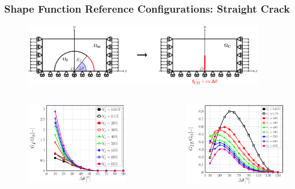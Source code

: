 \documentclass[first,firstsupp,lastsupp,last,hyperref,table]{ETHclass}
\begin{document}
\begin{frame}
\frametitle{\vspace{0.4cm}\footnotesize Shape Function Reference Configurations: Straight Crack}
\vspace{-1.25cm}
\centering
\begin{figure}
\includegraphics[width=0.9\textwidth]{RUCstraightcrack.pdf}
\end{figure}
\vspace{-0.5cm}
\begin{columns}[c]
\begin{column}{0.5\textwidth}
\centering
\begin{figure}
\centering
\includegraphics[width=0.9\columnwidth]{GI-free-straightcrack.pdf}
\end{figure}
\end{column}
\begin{column}{0.5\textwidth}
\centering
\begin{figure}
\centering
\includegraphics[width=0.9\columnwidth]{GII-free-straightcrack.pdf}

\end{figure}
\end{column}
\end{columns}
\end{frame}
\end{document}
